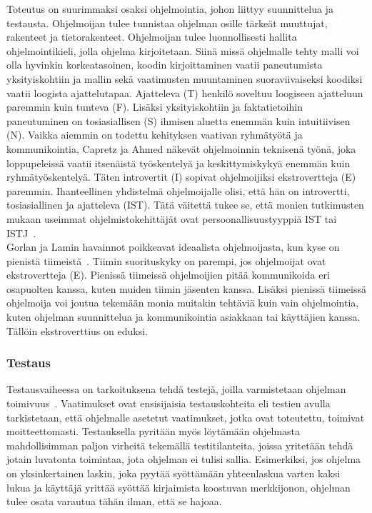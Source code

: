 \documentclass[finnish]{../tktltiki2}
\theoremstyle{definition}
\theoremstyle{remark}
\begin{document}
Toteutus on suurimmaksi osaksi ohjelmointia, johon liittyy suunnittelua ja testausta. Ohjelmoijan tulee tunnistaa ohjelman
osille tärkeät muuttujat, rakenteet ja tietorakenteet. Ohjelmoijan
tulee luonnollisesti hallita ohjelmointikieli, jolla ohjelma kirjoitetaan. Siinä missä ohjelmalle tehty malli voi olla hyvinkin korkeatasoinen, koodin kirjoittaminen vaatii paneutumista yksityiskohtiin ja mallin sekä vaatimusten muuntaminen suoraviivaiseksi koodiksi vaatii loogista ajattelutapaa. Ajatteleva (T)
henkilö soveltuu loogiseen ajatteluun paremmin kuin tunteva (F). Lisäksi yksityiskohtiin ja faktatietoihin paneutuminen on tosiasiallisen (S) ihmisen aluetta enemmän kuin intuitiivisen (N). Vaikka aiemmin on todettu kehityksen vaativan ryhmätyötä ja kommunikointia, Capretz ja Ahmed näkevät ohjelmoinnin teknisenä työnä, joka loppupeleissä vaatii itsenäistä työskentelyä ja keskittymiskykyä enemmän kuin ryhmätyöskentelyä. Täten introvertit (I) sopivat ohjelmoijiksi ekstrovertteja (E) paremmin. Ihanteellinen yhdistelmä ohjelmoijalle olisi, että hän on introvertti, tosiasiallinen ja ajatteleva (IST). Tätä väitettä tukee se, että monien tutkimusten mukaan useimmat ohjelmistokehittäjät ovat persoonallisuustyyppiä IST tai ISTJ~\cite{Capretz:2003:PTS:766407.766410,Capretz:2010:MSS:1726559.1726574}.\\

Gorlan ja Lamin havainnot poikkeavat ideaalista ohjelmoijasta, kun kyse on pienistä tiimeistä~\cite{Gorla:2004:WWB:990680.990684}. Tiimin suorituskyky on parempi, jos ohjelmoijat ovat ekstrovertteja (E). Pienissä tiimeissä ohjelmoijien pitää kommunikoida eri osapuolten kanssa, kuten muiden tiimin jäsenten kanssa. Lisäksi pienissä tiimeissä ohjelmoija voi joutua tekemään monia muitakin tehtäviä kuin vain ohjelmointia, kuten ohjelman suunnittelua ja kommunikointia asiakkaan tai käyttäjien kanssa. Tällöin ekstroverttius on eduksi.

\subsubsection{Testaus}

Testausvaiheessa on tarkoituksena tehdä testejä, joilla varmistetaan ohjelman toimivuus~\cite{SWEBOK:409902}. Vaatimukset ovat ensisijaisia
testauskohteita eli testien avulla tarkistetaan, että ohjelmalle asetetut vaatimukset, jotka ovat toteutettu, toimivat
moitteettomasti. Testauksella pyritään myös löytämään ohjelmasta mahdollisimman paljon virheitä tekemällä testitilanteita, joissa yritetään
tehdä jotain luvatonta toimintaa, jota ohjelman ei tulisi sallia. Esimerkiksi, jos ohjelma on yksinkertainen laskin,
joka pyytää syöttämään yhteenlaskua varten kaksi lukua ja käyttäjä yrittää syöttää kirjaimista koostuvan merkkijonon, ohjelman
tulee osata varautua tähän ilman, että se hajoaa.\\
\end{document}
